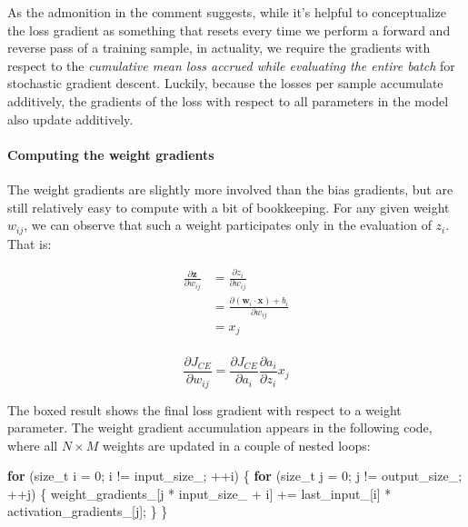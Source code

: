 \documentclass[
]{article}
\newenvironment{Shaded}{}{}
\newcommand{\ControlFlowTok}[1]{\textcolor[rgb]{0.00,0.44,0.13}{\textbf{#1}}}
\newcommand{\DataTypeTok}[1]{\textcolor[rgb]{0.56,0.13,0.00}{#1}}
\newcommand{\DecValTok}[1]{\textcolor[rgb]{0.25,0.63,0.44}{#1}}
\newcommand{\NormalTok}[1]{#1}
\newcommand{\VariableTok}[1]{\textcolor[rgb]{0.10,0.09,0.49}{#1}}
\begin{document}
As the admonition in the comment suggests, while it's helpful to
conceptualize the loss gradient as something that resets every time we
perform a forward and reverse pass of a training sample, in actuality,
we require the gradients with respect to the \emph{cumulative mean loss
accrued while evaluating the entire batch} for stochastic gradient
descent. Luckily, because the losses per sample accumulate additively,
the gradients of the loss with respect to all parameters in the model
also update additively.

\hypertarget{computing-the-weight-gradients}{%
\paragraph{Computing the weight
gradients}\label{computing-the-weight-gradients}}

The weight gradients are slightly more involved than the bias gradients,
but are still relatively easy to compute with a bit of bookkeeping. For
any given weight \(w_{ij}\), we can observe that such a weight
participates only in the evaluation of \(z_i\). That is:

\[
\begin{aligned}
\frac{\partial \mathbf{z}}{\partial w_{ij}} &= \frac{\partial z_i}{\partial w_{ij}} \\
&= \frac{\partial (\mathbf{w}_{i} \cdot \mathbf{x}) + b_i}{\partial w_{ij}} \\
&= x_j \\
\end{aligned}
\]

\[
\boxed{\frac{\partial J_{CE}}{\partial w_{ij}} = \frac{\partial J_{CE}}{\partial a_i}\frac{\partial a_i}{\partial z_i}x_j}
\]

The boxed result shows the final loss gradient with respect to a weight
parameter. The weight gradient accumulation appears in the following
code, where all \(N \times M\) weights are updated in a couple of nested
loops:

\begin{Shaded}
\begin{Highlighting}[]
    \ControlFlowTok{for}\NormalTok{ (}\DataTypeTok{size\_t}\NormalTok{ i = }\DecValTok{0}\NormalTok{; i != }\VariableTok{input\_size\_}\NormalTok{; ++i)}
\NormalTok{    \{}
        \ControlFlowTok{for}\NormalTok{ (}\DataTypeTok{size\_t}\NormalTok{ j = }\DecValTok{0}\NormalTok{; j != }\VariableTok{output\_size\_}\NormalTok{; ++j)}
\NormalTok{        \{}
            \VariableTok{weight\_gradients\_}\NormalTok{[j * }\VariableTok{input\_size\_}\NormalTok{ + i]}
\NormalTok{                += }\VariableTok{last\_input\_}\NormalTok{[i] * }\VariableTok{activation\_gradients\_}\NormalTok{[j];}
\NormalTok{        \}}
\NormalTok{    \}}
\end{Highlighting}
\end{Shaded}
\end{document}
